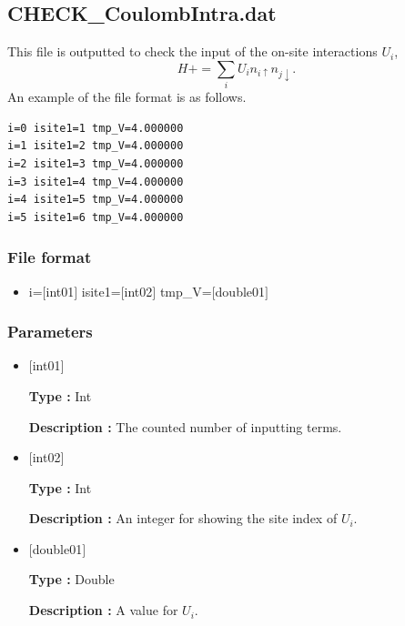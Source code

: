 \newpage
\subsection{CHECK\_CoulombIntra.dat}
This file is outputted to check the input of the on-site interactions $U_i$,
\begin{equation}
H+=\sum_{i} U_i n_{i\uparrow} n_{j \downarrow}.
\end{equation}
An example of the file format is as follows.

\begin{minipage}{12.5cm}
\begin{screen}
\begin{verbatim}
i=0 isite1=1 tmp_V=4.000000 
i=1 isite1=2 tmp_V=4.000000 
i=2 isite1=3 tmp_V=4.000000 
i=3 isite1=4 tmp_V=4.000000 
i=4 isite1=5 tmp_V=4.000000 
i=5 isite1=6 tmp_V=4.000000 
\end{verbatim}
\end{screen}
\end{minipage}

\subsubsection{File format}
 \begin{itemize}
   \item  i=$[$int01$]$ isite1=$[$int02$]$  tmp\_V=$[$double01$]$ 
 \end{itemize}
 
\subsubsection{Parameters}
 \begin{itemize}

    \item  $[$int01$]$ 
   
    {\bf Type :} Int

   {\bf Description :} The counted number of inputting terms.
      
   \item  $[$int02$]$
   
    {\bf Type :} Int

    {\bf Description :}   An integer for showing the site index of $U_i$.
    
   \item  $[$double01$]$ 
   
    {\bf Type :} Double

   {\bf Description :} A value for $U_i$.
\end{itemize}

